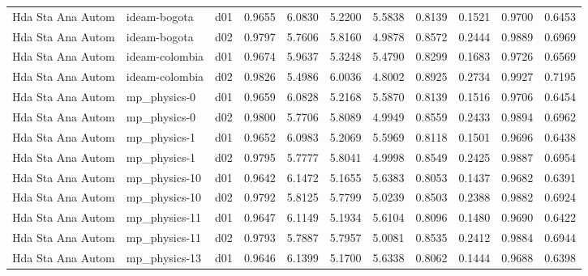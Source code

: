 \begin{longtable}{lllrrrrrrrr}
    Hda Sta Ana Autom  &          ideam-bogota &     d01 &   0.9655 &   6.0830 &   5.2200 &       5.5838 &        0.8139 &       0.1521 &           0.9700 &  0.6453 \\
    Hda Sta Ana Autom  &          ideam-bogota &     d02 &   0.9797 &   5.7606 &   5.8160 &       4.9878 &        0.8572 &       0.2444 &           0.9889 &  0.6969 \\
    Hda Sta Ana Autom  &        ideam-colombia &     d01 &   0.9674 &   5.9637 &   5.3248 &       5.4790 &        0.8299 &       0.1683 &           0.9726 &  0.6569 \\
    Hda Sta Ana Autom  &        ideam-colombia &     d02 &   0.9826 &   5.4986 &   6.0036 &       4.8002 &        0.8925 &       0.2734 &           0.9927 &  0.7195 \\
    Hda Sta Ana Autom  &          mp\_physics-0 &     d01 &   0.9659 &   6.0828 &   5.2168 &       5.5870 &        0.8139 &       0.1516 &           0.9706 &  0.6454 \\
    Hda Sta Ana Autom  &          mp\_physics-0 &     d02 &   0.9800 &   5.7706 &   5.8089 &       4.9949 &        0.8559 &       0.2433 &           0.9894 &  0.6962 \\
    Hda Sta Ana Autom  &          mp\_physics-1 &     d01 &   0.9652 &   6.0983 &   5.2069 &       5.5969 &        0.8118 &       0.1501 &           0.9696 &  0.6438 \\
    Hda Sta Ana Autom  &          mp\_physics-1 &     d02 &   0.9795 &   5.7777 &   5.8041 &       4.9998 &        0.8549 &       0.2425 &           0.9887 &  0.6954 \\
    Hda Sta Ana Autom  &         mp\_physics-10 &     d01 &   0.9642 &   6.1472 &   5.1655 &       5.6383 &        0.8053 &       0.1437 &           0.9682 &  0.6391 \\
    Hda Sta Ana Autom  &         mp\_physics-10 &     d02 &   0.9792 &   5.8125 &   5.7799 &       5.0239 &        0.8503 &       0.2388 &           0.9882 &  0.6924 \\
    Hda Sta Ana Autom  &         mp\_physics-11 &     d01 &   0.9647 &   6.1149 &   5.1934 &       5.6104 &        0.8096 &       0.1480 &           0.9690 &  0.6422 \\
    Hda Sta Ana Autom  &         mp\_physics-11 &     d02 &   0.9793 &   5.7887 &   5.7957 &       5.0081 &        0.8535 &       0.2412 &           0.9884 &  0.6944 \\
    Hda Sta Ana Autom  &         mp\_physics-13 &     d01 &   0.9646 &   6.1399 &   5.1700 &       5.6338 &        0.8062 &       0.1444 &           0.9688 &  0.6398 \\

\end{longtable}
